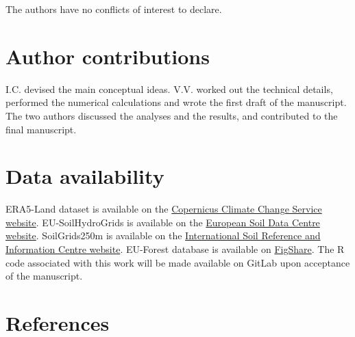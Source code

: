 \documentclass[11pt,]{article}
\begin{document}
The authors have no conflicts of interest to declare.

\hypertarget{author-contributions}{%
\section{Author contributions}\label{author-contributions}}

I.C. devised the main conceptual ideas. V.V. worked out the technical
details, performed the numerical calculations and wrote the first draft
of the manuscript. The two authors discussed the analyses and the
results, and contributed to the final manuscript.

\hypertarget{data-availability}{%
\section{Data availability}\label{data-availability}}

ERA5-Land dataset is available on the
\href{https://cds.climate.copernicus.eu/cdsapp\#!/dataset/reanalysis-era5-land?tab=overview}{Copernicus
Climate Change Service website}. EU-SoilHydroGrids is available on the
\href{https://esdac.jrc.ec.europa.eu/content/3d-soil-hydraulic-database-europe-1-km-and-250-m-resolution}{European
Soil Data Centre website}. SoilGrids250m is available on the
\href{https://www.isric.org/explore/soilgrids}{International Soil
Reference and Information Centre website}. EU-Forest database is
available on
\href{https://figshare.com/collections/A_high-resolution_pan-European_tree_occurrence_dataset/3288407}{FigShare}.
The R code associated with this work will be made available on GitLab
upon acceptance of the manuscript.

\hypertarget{references}{%
\section{References}\label{references}}

\setlength{\parindent}{-0.2in}
\setlength{\leftskip}{0.2in}
\setlength{\parskip}{8pt}
\vspace*{-0.2in}

\noindent
\end{document}
